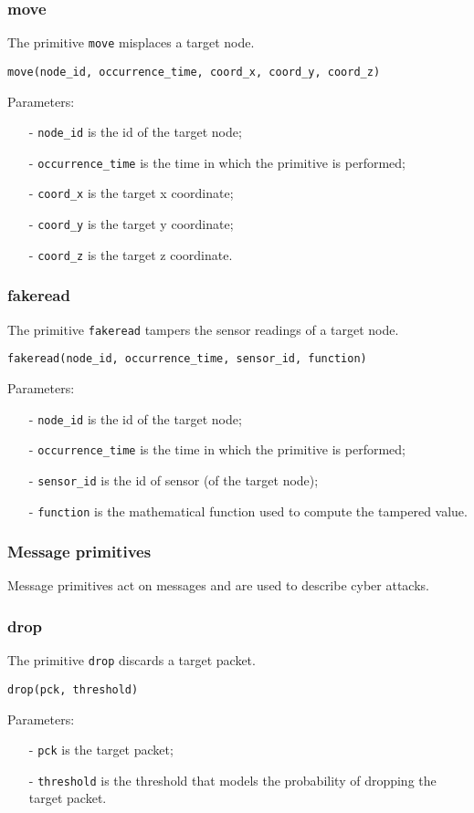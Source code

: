 \subsubsection{move}
The primitive \texttt{move} misplaces a target node.
%
\begin{lstlisting}[language={adl}]
move(node_id, occurrence_time, coord_x, coord_y, coord_z)
\end{lstlisting}
%
Parameters:
%
\begin{itemize}
\item[-] \texttt{node\_id} is the id of the target node;
\item[-] \texttt{occurrence\_time} is the time in which the primitive is performed;
\item[-] \texttt{coord\_x} is the target x coordinate;
\item[-] \texttt{coord\_y} is the target y coordinate;
\item[-] \texttt{coord\_z} is the target z coordinate.
\end{itemize}

\subsubsection{fakeread}
The primitive \texttt{fakeread} tampers the sensor readings of a target node.
%
\begin{lstlisting}[language={adl}]
fakeread(node_id, occurrence_time, sensor_id, function)
\end{lstlisting}
%
Parameters:
%
\begin{itemize}
\item[-] \texttt{node\_id} is the id of the target node;
\item[-] \texttt{occurrence\_time} is the time in which the primitive is performed;
\item[-] \texttt{sensor\_id} is the id of sensor (of the target node);
\item[-] \texttt{function} is the mathematical function used to compute the tampered value.
\end{itemize}



\subsubsection{Message primitives}
Message primitives act on messages and are used to describe cyber attacks.

\subsubsection{drop}
The primitive \texttt{drop} discards a target packet.
%
\begin{lstlisting}[language={adl}]
drop(pck, threshold)
\end{lstlisting}
%
Parameters:
%
\begin{itemize}
\item[-] \texttt{pck} is the target packet;
\item[-] \texttt{threshold} is the threshold that models the probability of dropping the target packet.
\end{itemize}

